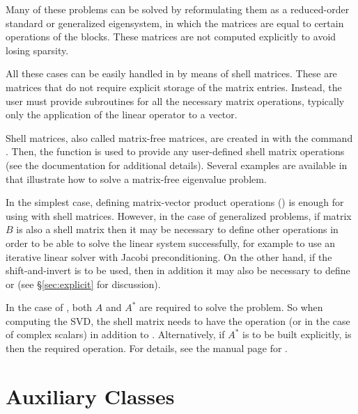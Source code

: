 	Many of these problems can be solved by reformulating them as a reduced-order standard or generalized eigensystem, in which the matrices are equal to certain operations of the blocks. These matrices are not computed explicitly to avoid losing sparsity.

	All these cases can be easily handled in \slepc by means of shell matrices. These are matrices that do not require explicit storage of the matrix entries. Instead, the user must provide subroutines for all the necessary matrix operations, typically only the application of the linear operator to a vector. 

	Shell matrices, also called matrix-free matrices, are created in \petsc with the command . Then, the function  is used to provide any user-defined shell matrix operations (see the \petsc{} documentation for additional details). Several examples are available in \slepc that illustrate how to solve a matrix-free eigenvalue problem.

	In the simplest case, defining matrix-vector product operations () is enough for using  with shell matrices. However, in the case of generalized problems, if matrix $B$ is also a shell matrix then it may be necessary to define other operations in order to be able to solve the linear system successfully, for example  to use an iterative linear solver with Jacobi preconditioning. On the other hand, if the shift-and-invert  is to be used, then in addition it may also be necessary to define  or  (see \S\ref{sec:explicit} for discussion).

	In the case of , both $A$ and $A^*$ are required to solve the problem. So when computing the SVD, the shell matrix needs to have the  operation (or  in the case of complex scalars) in addition to . Alternatively, if $A^*$ is to be built explicitly,  is then the required operation. For details, see the manual page for .

\section{Auxiliary Classes}
\label{sec:sys}

